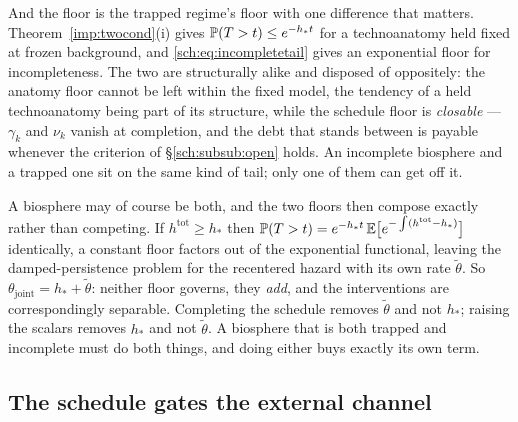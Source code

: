 And the floor is the trapped regime's floor with one difference that
matters. Theorem~\ref{imp:twocond}(i) gives $\mathbb{P}(T>t)\le e^{-h_\ast t}$
for a technoanatomy held fixed at frozen background, and \eqref{sch:eq:incompletetail}
gives an
exponential floor for incompleteness. The two are structurally alike and
disposed of oppositely: the anatomy floor cannot be left within the fixed
model, the tendency of a held technoanatomy being part of its structure,
while the schedule floor is \emph{closable} --- $\gamma_k$
and $\nu_k$ vanish at completion, and the debt that stands between is
payable whenever the criterion of \S\ref{sch:subsub:open} holds. An
incomplete biosphere and a trapped one sit on the same kind of tail; only
one of them can get off it.

A biosphere may of course be both, and the two floors then compose
exactly rather than competing. If $h^{\mathrm{tot}}\ge h_\ast$ then
$\mathbb{P}(T>t)=e^{-h_\ast t}\,\mathbb{E}\bigl[e^{-\int(h^{\mathrm{tot}}-h_\ast)}\bigr]$
identically, a constant floor factors out of the exponential
functional, leaving the damped-persistence problem for the recentered
hazard with its own rate $\tilde\theta$. So
$\theta_{\mathrm{joint}}=h_\ast+\tilde\theta$: neither floor governs, they
\emph{add}, and the interventions are correspondingly separable.
Completing the schedule removes $\tilde\theta$ and not $h_\ast$; raising
the scalars removes $h_\ast$ and not $\tilde\theta$. A biosphere that is both
trapped and incomplete must do both things, and doing either buys exactly
its own term.

\subsection{The schedule gates the external channel}
\label{sch:subsub:gating}


